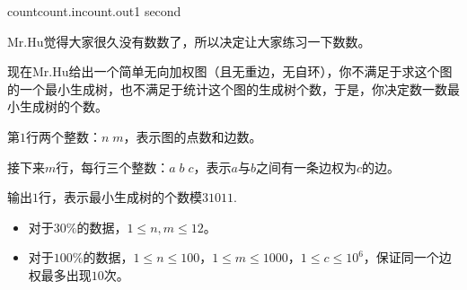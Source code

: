 \documentclass[11pt,a4paper,oneside]{article}
\begin{document}
\begin{problem}{count}{count.in}{count.out}{1 second} 
	
	Mr.Hu觉得大家很久没有数数了，所以决定让大家练习一下数数。
	
	现在Mr.Hu给出一个简单无向加权图（且无重边，无自环），你不满足于求这个图的一个最小生成树，也不满足于统计这个图的生成树个数，于是，你决定数一数最小生成树的个数。
	
	\InputFile
	
	第$1$行两个整数：$n \; m$，表示图的点数和边数。
	
	接下来$m$行，每行三个整数：$a \; b \; c$，表示$a$与$b$之间有一条边权为$c$的边。
	
	\OutputFile
	
	输出$1$行，表示最小生成树的个数模$31011$.
	
	\Example
	
	\begin{example}
	\end{example}
	
	\Note
	
	\begin{itemize}
		\item 对于$30\%$的数据，$1 \leq n, m \leq 12$。
		\item 对于$100\%$的数据，$1 \leq n \leq 100$，$1 \leq m \leq 1000$，$1 \leq c \leq 10^6$，保证同一个边权最多出现$10$次。
	\end{itemize}

\end{problem}
\end{document}
